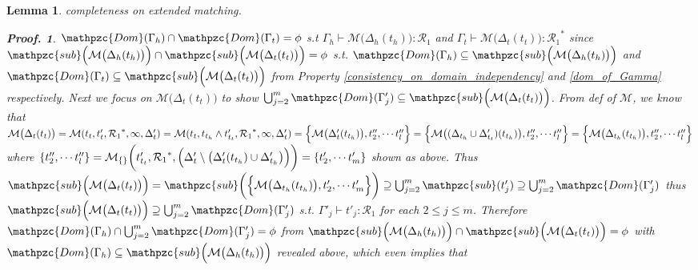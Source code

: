 \documentclass[12pt]{article}
\newtheorem{Lemma}{Lemma}[section]
\newtheorem{Proof}{Proof.}
\begin{document}
\begin{Lemma}{completeness on extended matching.}
\begin{Proof}
    $\mathpzc{Dom}(\Gamma_h) \cap \mathpzc{Dom}(\Gamma_t) = \phi$ s.t
    $\Gamma_h \vdash \mathcal{M}\bigl(\Delta_h(t_h) \bigr) :
    \mathcal{R}_1$ and
    $\Gamma_t \vdash \mathcal{M}\bigl(\Delta_t(t_t) \bigr)
    :{\mathcal{R}_1}^*$ since
    $\mathpzc{sub}\Bigl(\mathcal{M}\bigl(\Delta_h(t_h) \bigr) \Bigr) \cap
    \mathpzc{sub}\Bigl(\mathcal{M}\bigl(\Delta_t(t_t) \bigr) \Bigr) =
    \phi$ s.t.
    $\mathpzc{Dom}(\Gamma_h) \subseteq
    \mathpzc{sub}\Bigl(\mathcal{M}\bigl(\Delta_h(t_h) \bigr) \Bigr)$ and
    $\mathpzc{Dom}(\Gamma_t) \subseteq
    \mathpzc{sub}\Bigl(\mathcal{M}\bigl(\Delta_t(t_t) \bigr) \Bigr)$ from
    Property \ref{consistency_on_domain_independency} and
    \ref{dom_of_Gamma} respectively.
    Next we focus on $\mathcal{M}\bigl(\Delta_t(t_t) \bigr)$ to show
    $\bigcup_{j=2}^m \mathpzc{Dom}(\Gamma'_j) \subseteq
    \mathpzc{sub}\Bigl(\mathcal{M}\bigl(\Delta_t(t_t) \bigr) \Bigr)$.
    From def of $\mathcal{M}$, we know that
    $\mathcal{M}\bigl(\Delta_t(t_t) \bigr) =
    \mathcal{M}(t_t, t'_t, {\mathcal{R}_1}^*, \infty, \Delta'_t) =
    \mathcal{M}(t_t, t_{t_h} \wedge t'_{t_t}, {\mathcal{R}_1}^*, \infty,
    \Delta'_t) =
    \Bigl\{\mathcal{M}\bigl(\Delta'_t(t_{t_h}) \bigr), t''_2, \cdots
    t''_l \Bigr\} =
    \Bigl\{\mathcal{M}\bigl((\Delta_{t_h} \cup \Delta'_{t_t})(t_{t_h})
    \bigr), t''_2, \cdots t''_l \Bigr\} =
    \Bigl\{\mathcal{M}\bigl(\Delta_{t_h}(t_{t_h}) \bigr), t''_2, \cdots
    t''_l \Bigr\}$ where
    $\{t''_2, \cdots t''_l \} =
    \mathcal{M}_{\{\}}\biggl(t'_{t_t}, {\mathcal{R}_1}^*, \Bigl(\Delta'_t
    \setminus \bigl(\Delta'_t(t_{t_h}) \cup \Delta'_{t_h} \bigr) \Bigr)
    \biggr) = \{t'_2, \cdots t'_m \}$ shown as above. Thus
    $\mathpzc{sub}\Bigl(\mathcal{M}\bigl(\Delta_t(t_t) \bigr) \Bigr) =
    \mathpzc{sub}\biggl(\Bigl\{\mathcal{M}\bigl(\Delta_{t_h}(t_{t_h}) \bigr),
    t'_2, \cdots t'_m \Bigr\} \biggr) \supseteq
    \bigcup_{j=2}^m \mathpzc{sub}(t'_j) \supseteq
    \bigcup_{j=2}^m \mathpzc{Dom}(\Gamma'_j)$ thus
    $\mathpzc{sub}\Bigl(\mathcal{M}\bigl(\Delta_t(t_t) \bigr) \Bigr)
    \supseteq \bigcup_{j=2}^m \mathpzc{Dom}(\Gamma'_j)$ s.t.
    $\Gamma'_j \vdash t'_j : \mathcal{R}_1$ for each $2 \le j \le m$.
    Therefore
    $\mathpzc{Dom}(\Gamma_h) \cap \bigcup_{j=2}^m \mathpzc{Dom}(\Gamma'_j)
    = \phi$ from
    $\mathpzc{sub}\Bigl(\mathcal{M}\bigl(\Delta_h(t_h) \bigr) \Bigr) \cap
    \mathpzc{sub}\Bigl(\mathcal{M}\bigl(\Delta_t(t_t) \bigr) \Bigr) =
    \phi$ with
    $\mathpzc{Dom}(\Gamma_h) \subseteq \mathpzc{sub}\Bigl(\mathcal{M}\bigl(
    \Delta_h(t_h) \bigr) \Bigr)$ revealed above, which even implies that

\end{Proof}
\end{Lemma}
\end{document}
